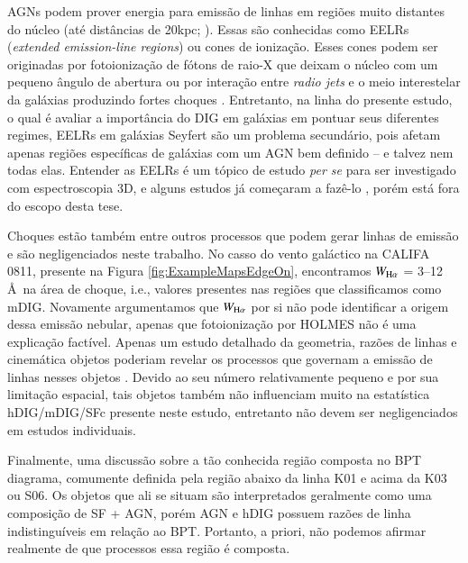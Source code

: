 AGNs podem prover energia para emissão de linhas em regiões muito distantes do núcleo (até distâncias de 20kpc; \citealt{Veilleux.etal.2003}). Essas são conhecidas como EELRs ({\em extended emission-line regions}) ou cones de ionização. Esses cones podem ser originadas por fotoionização de fótons de raio-X que deixam o núcleo com um pequeno ângulo de abertura ou por interação entre {\em radio jets} e o meio interestelar da galáxias produzindo fortes choques \citep{Wilson.1996}. Entretanto, na linha do presente estudo, o qual é avaliar a importância do DIG em galáxias em pontuar seus diferentes regimes, EELRs em galáxias Seyfert são um problema secundário, pois afetam apenas regiões específicas de galáxias com um AGN bem definido -- e talvez nem todas elas. Entender as EELRs é um tópico de estudo {\em per se} para ser investigado com espectroscopia 3D, e alguns estudos já começaram a fazê-lo \citep[e.g.,][]{Dopita.etal.2014}, porém está fora do escopo desta tese.

Choques estão também entre outros processos que podem gerar linhas de emissão e são negligenciados neste trabalho. No casso do vento galáctico na CALIFA 0811, presente na Figura \ref{fig:ExampleMapsEdgeOn}, encontramos $W_{\Ha}$ = 3--12 \AA\ na área de choque, i.e., valores presentes nas regiões que classificamos como mDIG. Novamente argumentamos que $W_{\Ha}$ por si não pode identificar a origem dessa emissão nebular, apenas que fotoionização por HOLMES não é uma explicação factível. Apenas um estudo detalhado da geometria, razões de linhas e cinemática objetos poderiam revelar os processos que governam a emissão de linhas nesses objetos \citep{Kreckel.etal.2014, Beirao.etal.2015, LopezCoba.etal.2017}. Devido ao seu número relativamente pequeno e por sua limitação espacial, tais objetos também não influenciam muito na estatística hDIG/mDIG/SFc presente neste estudo, entretanto não devem ser negligenciados em estudos individuais.

Finalmente, uma discussão sobre a tão conhecida região composta no BPT diagrama, comumente definida pela região abaixo da linha K01 e acima da K03 ou S06. Os objetos que ali se situam são interpretados geralmente como uma composição de SF + AGN, porém AGN e hDIG possuem razões de linha indistinguíveis em relação ao BPT. Portanto, a priori, não podemos afirmar realmente de que processos essa região é composta.

